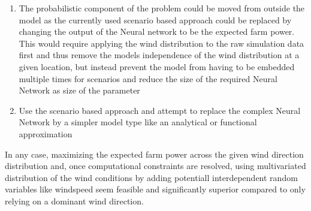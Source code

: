 \begin{enumerate}
	\item The probabilistic component of the problem could be moved from outside the model as the currently used scenario based approach could be replaced by changing the output of the Neural network to be the expected farm power. This would require applying the wind distribution to the raw simulation data first and thus remove the models independence of the wind distribution at a given location, but instead prevent the model from having to be embedded multiple times for scenarios and reduce the size of the required Neural Network as size of the parameter 
	\item Use the scenario based approach and attempt to replace the complex Neural Network by a simpler model type like an analytical or functional approximation 
\end{enumerate}


In any case, maximizing the expected farm power across the given wind direction distribution and, once computational constraints are resolved, using multivariated distribution of the wind conditions by adding potentiall interdependent random variables like windspeed seem feasible and significantly superior compared to only relying on a dominant wind direction. 